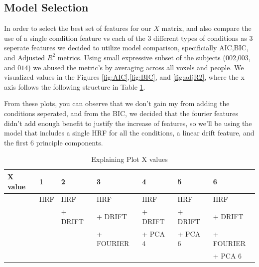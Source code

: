 \subsection{Model Selection}

\par In order to select the best set of features for our $X$ matrix, and also 
compare the use of a single condition feature vs each of the 3 different types
of conditions as 3 seperate features we decided to utilize model comparison, 
specificially AIC,BIC, and Adjusted $R^2$ metrics. Using small expressive
subset of the subjects ($002$,$003$, and $014$) we abused the metric's by
averaging across all voxels and people.  We visualized values in the Figures
\ref{fig:AIC},\ref{fig:BIC}, and \ref{fig:adjR2}, where the x axis follows the 
following structure in Table \ref{tab:plot}.

\par From these plots, you can observe that we don't gain my from adding
the conditions seperated, and from the BIC, we decided that the fourier
features didn't add enough benefit to justify the increase of features, so we'll
be using the model that includes a single HRF for all the conditions, a linear
drift feature, and the first 6 principle components.

\begin{table}
\centering
	\begin{tabular}{l ||  l   |  l  |   l    | l  | l  |  l}
X value & 1 &        2       &             3       &     4         &        5        &         6       \\
	 \hline
	 & HRF &   HRF       &  HRF            & HRF         &  HRF        & HRF  \\
	 &        &   + DRIFT &  + DRIFT      & + DRIFT  &  + DRIFT   & + DRIFT  \\
	 &        &                 &  + FOURIER &  + PCA 4 &  + PCA 6   & + FOURIER \\
	 &        &                 &                      &                &                   & +  PCA 6 \\
	

	\end{tabular}
\caption{Explaining Plot X values}
\label{tab:plot}
\end{table}


